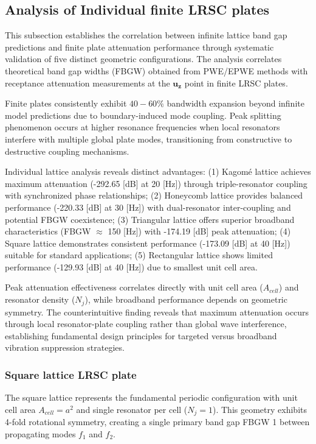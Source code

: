 \documentclass[review,numbers,sort&compress]{elsarticle}
\begin{document}
\subsection{Analysis of Individual finite LRSC plates}\label{indi_panel_lats}
This subsection establishes the correlation between infinite lattice band gap predictions and finite plate attenuation performance through systematic validation of five distinct geometric configurations. The analysis correlates theoretical band gap widths (FBGW) obtained from PWE/EPWE methods with receptance attenuation measurements at the $\mathbf{u_z}$ point in finite LRSC plates.

Finite plates consistently exhibit $40-60\%$ bandwidth expansion beyond infinite model predictions due to boundary-induced mode coupling. Peak splitting phenomenon occurs at higher resonance frequencies when local resonators interfere with multiple global plate modes, transitioning from constructive to destructive coupling mechanisms.

Individual lattice analysis reveals distinct advantages: (1) Kagomé lattice achieves maximum attenuation (-292.65 [dB] at 20 [Hz]) through triple-resonator coupling with synchronized phase relationships; (2) Honeycomb lattice provides balanced performance (-220.33 [dB] at 30 [Hz]) with dual-resonator inter-coupling and potential FBGW coexistence; (3) Triangular lattice offers superior broadband characteristics (FBGW $\approx$ 150 [Hz]) with -174.19 [dB] peak attenuation; (4) Square lattice demonstrates consistent performance (-173.09 [dB] at 40 [Hz]) suitable for standard applications; (5) Rectangular lattice shows limited performance (-129.93 [dB] at 40 [Hz]) due to smallest unit cell area.

Peak attenuation effectiveness correlates directly with unit cell area ($A_{cell}$) and resonator density ($N_j$), while broadband performance depends on geometric symmetry. The counterintuitive finding reveals that maximum attenuation occurs through local resonator-plate coupling rather than global wave interference, establishing fundamental design principles for targeted versus broadband vibration suppression strategies.

\subsubsection{Square lattice LRSC plate}\label{panel_lat_s}

The square lattice represents the fundamental periodic configuration with unit cell area $A_{cell} = a^2$ and single resonator per cell ($N_j = 1$). This geometry exhibits 4-fold rotational symmetry, creating a single primary band gap FBGW 1 between propagating modes $f_1$ and $f_2$. 
\end{document}

